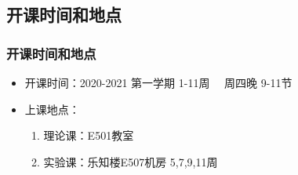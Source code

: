 \documentclass[11pt]{beamer}
\begin{document}
\subsection{开课时间和地点}
\begin{frame}
	\frametitle{开课时间和地点}
	\begin{itemize}
		\item 开课时间：2020-2021 第一学期 1-11周 \ \ 周四晚 9-11节
		\item 上课地点：
		      \begin{enumerate}
			      \item 理论课：E501教室 
			      \item 实验课：乐知楼E507机房 5,7,9,11周
		      \end{enumerate}
	\end{itemize}
\end{frame}
\end{document}

